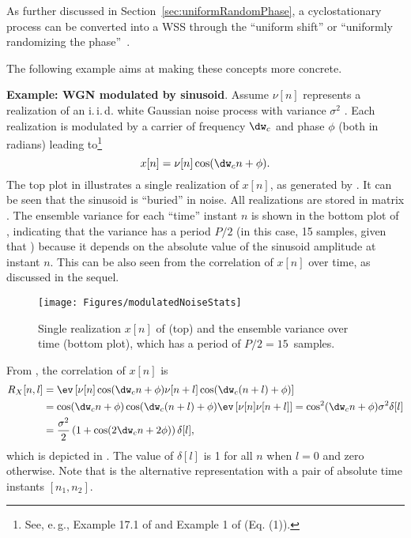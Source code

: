 As further discussed in Section~\ref{sec:uniformRandomPhase}, a cyclostationary process can be converted into a WSS through the ``uniform shift'' or ``uniformly randomizing the phase''~\cite{Giannakis99}. 

The following example aims at making these concepts more concrete.

\bExample \textbf{Example: WGN modulated by sinusoid}.
\label{ex:wgnModulatedEnsemble}
Assume $\nu[n]$ represents a realization of
an i.\,i.\,d. white Gaussian noise process with variance $\sigma^2$ . Each realization is modulated by a carrier of frequency $\dw_c$ and phase $\phi$ (both in radians) leading to\footnote{See, e.\,g., Example 17.1 of \cite{Giannakis99} and Example 1 of \cite{Antoni07} (Eq. (1)).}
\begin{equation}
x[n] = \nu[n] \cos(\dw_c n + \phi).
\label{eq:modulatedWGN}
\end{equation}
The top plot in  illustrates a single realization of $x[n]$, as generated
by . It can be seen that the sinusoid is ``buried'' in noise.
All  realizations are stored in matrix . The ensemble variance for each
``time'' instant $n$ is shown in the bottom plot of , indicating that the
variance has a period $P/2$ (in this case, 15 samples, given that ) because it
depends on the absolute value of the sinusoid amplitude at instant $n$. This can be also
seen from the correlation of $x[n]$ over time, as discussed in the sequel.


\begin{figure}[htbp]
\centering
\texttt{[image: Figures/modulatedNoiseStats]}
\caption{Single realization $x[n]$ of  (top) and the ensemble
variance over time (bottom plot), which has a period of $P/2=15$~samples.\label{fig:modulatedNoiseStats}}
\end{figure}

From , the correlation of $x[n]$ is
\begin{align}
R_X[n,l] &= \ev \left[\nu[n] \cos(\dw_c n + \phi) \nu[n+l] \cos(\dw_c (n+l) + \phi) \right] \nonumber \\
 &=  \cos(\dw_c n + \phi) \cos(\dw_c (n+l) + \phi) \ev \left[\nu[n] \nu[n+l] \right] = \cos^2(\dw_c n + \phi) \sigma^2 \delta[l] \nonumber \\
 &= \frac{\sigma^2}{2} \left(1 + \cos(2\dw_c n + 2\phi) \right) \delta[l],
\label{eq:modulatedNoiseCorrelation}
\end{align}
which is depicted in . The value of $\delta[l]$ is 1 for
all $n$ when $l=0$ and zero otherwise. Note that  is the
alternative representation with a pair of absolute time instants $[n_1,n_2]$.


